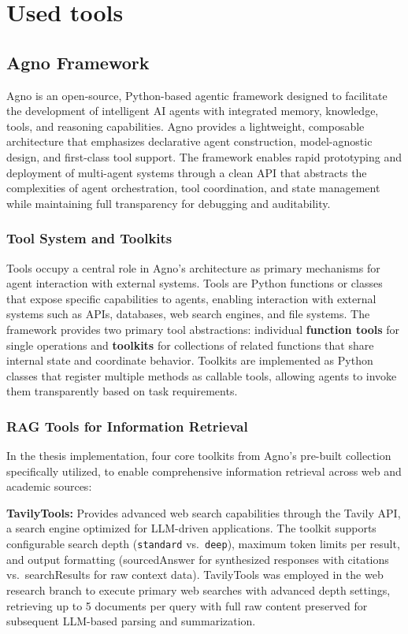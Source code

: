 \section{Used tools}


\subsection{Agno Framework}

Agno is an open-source, Python-based agentic framework designed to facilitate the development of intelligent AI agents with integrated memory, knowledge, tools, and reasoning capabilities. Agno provides a lightweight, composable architecture that emphasizes declarative agent construction, model-agnostic design, and first-class tool support. The framework enables rapid prototyping and deployment of multi-agent systems through a clean API that abstracts the complexities of agent orchestration, tool coordination, and state management while maintaining full transparency for debugging and auditability.


\subsubsection{Tool System and Toolkits}

Tools occupy a central role in Agno's architecture as primary mechanisms for agent interaction with external systems. Tools are Python functions or classes that expose specific capabilities to agents, enabling interaction with external systems such as APIs, databases, web search engines, and file systems. The framework provides two primary tool abstractions: individual \textbf{function tools} for single operations and \textbf{toolkits} for collections of related functions that share internal state and coordinate behavior. Toolkits are implemented as Python classes that register multiple methods as callable tools, allowing agents to invoke them transparently based on task requirements.

\subsubsection{RAG Tools for Information Retrieval}

In the thesis implementation, four core toolkits from Agno's pre-built collection specifically utilized, to enable comprehensive information retrieval across web and academic sources:

\textbf{TavilyTools:} Provides advanced web search capabilities through the Tavily API, a search engine optimized for LLM-driven applications. The toolkit supports configurable search depth (\texttt{standard} vs.\ \texttt{deep}), maximum token limits per result, and output formatting (sourcedAnswer for synthesized responses with citations vs.\ searchResults for raw context data). TavilyTools was employed in the web research branch to execute primary web searches with advanced depth settings, retrieving up to 5 documents per query with full raw content preserved for subsequent LLM-based parsing and summarization.

